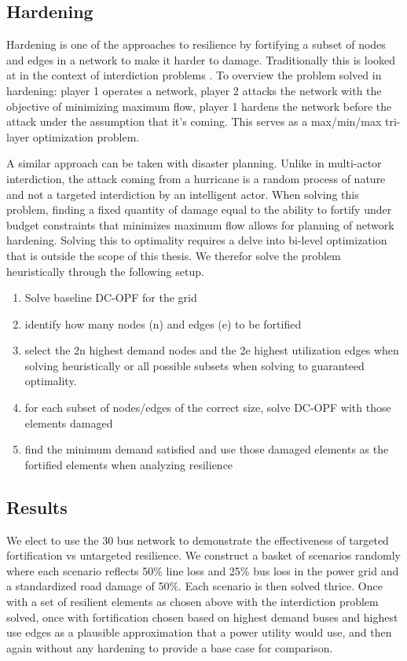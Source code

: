 \documentclass{article}
\begin{document}
	\subsection{Hardening}
	
	Hardening is one of the approaches to resilience by fortifying a subset of nodes and edges in a network to make it harder to damage. Traditionally this is looked at in the context of interdiction problems \cite{ChurchEA2007}. To overview the problem solved in hardening: player 1 operates a network, player 2 attacks the network with the objective of minimizing maximum flow, player 1 hardens the network before the attack under the assumption that it's coming. This serves as a max/min/max tri-layer optimization problem.
	
	A similar approach can be taken with disaster planning. Unlike in multi-actor interdiction, the attack coming from a hurricane is a random process of nature and not a targeted interdiction by an intelligent actor. When solving this problem, finding a fixed quantity of damage equal to the ability to fortify under budget constraints that minimizes maximum flow allows for planning of network hardening. Solving this to optimality requires a delve into bi-level optimization that is outside the scope of this thesis. We therefor solve the problem heuristically through the following setup.
	
	\begin{enumerate}
		
	\item Solve baseline DC-OPF for the grid
	\item identify how many nodes (n) and edges (e) to be fortified
	\item select the 2n highest demand nodes and the 2e highest utilization edges when solving heuristically or all possible subsets when solving to guaranteed optimality.
	\item for each subset of nodes/edges of the correct size, solve DC-OPF with those elements damaged
	\item find the minimum demand satisfied and use those damaged elements as the fortified elements when analyzing resilience 
	\end{enumerate}
	\subsection{Results}
	We elect to use the 30 bus network to demonstrate the effectiveness of targeted fortification vs untargeted resilience. We construct a basket of scenarios randomly where each scenario reflects 50\% line loss and 25\% bus loss in the power grid and a standardized road damage of 50\%. Each scenario is then solved thrice. Once with a set of resilient elements as chosen above with the interdiction problem solved, once with fortification chosen based on highest demand buses and highest use edges as a plausible approximation that a power utility would use, and then again without any hardening to provide a base case for comparison.
	
\end{document}
